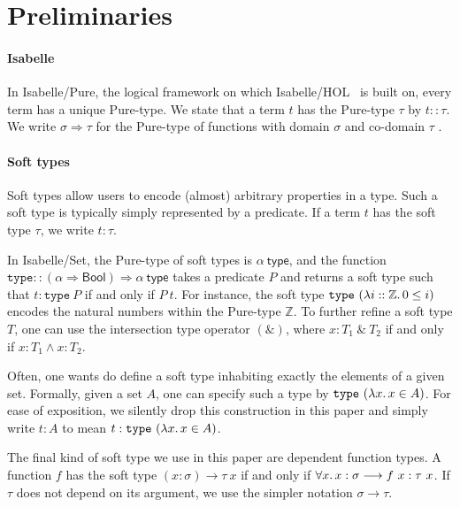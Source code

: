 \documentclass{article}
\theoremstyle{definition}
\newcommand{\bool}{\mathsf{Bool}}
\newcommand{\inte}{\mathbb{Z}}
\begin{document}
\section{Preliminaries}\label{sec-prelims}

\paragraph{Isabelle}
In Isabelle/Pure, the logical framework on which Isabelle/HOL~\cite{wenzel2021isabelle} is built on,
every term has a unique Pure-type. We state that a term \(t\) has the Pure-type \(\tau\) by \(t :: \tau\).
We write \(\sigma \Rightarrow \tau\) for the Pure-type of functions with domain \(\sigma\) and co-domain \(\tau\) .

\paragraph{Soft types}
Soft types allow users to encode (almost) arbitrary properties in a type.
Such a soft type is typically simply represented by a predicate.
If a term \(t\) has the soft type \(\tau\), we write \(t : \tau\).

In Isabelle/Set, the Pure-type of soft types is $\alpha\ \mathsf{type}$,
and the function \(\mathtt{type} :: (\alpha \Rightarrow \bool)\Rightarrow \alpha\ \mathsf{type}\) takes a predicate $P$ and returns a soft type such that
\(t : \mathtt{type}\ P\) if and only if \(P\ t\).
For instance, the soft type \(\mathtt{type}\ (\lambda i :: \inte\ldotp 0 \leq i)\) encodes the natural numbers within the Pure-type \(\inte\).
To further refine a soft type \(T\),
one can use the intersection type operator \((\&)\),
where \(x : T_1\  \&\  T_2\) if and only if \(x : T_1 \land x : T_2\).

Often, one wants do define a soft type inhabiting exactly the elements of a given set.
Formally, given a set $A$, one can specify such a type by \(\mathtt{type}\ (\lambda x\ldotp x \in A)\).
For ease of exposition, we silently drop this construction in this paper and simply write
$t : A$ to mean $t : \mathtt{type}\ (\lambda x\ldotp x \in A)$.

The final kind of soft type we use in this paper are dependent function types.
A function \(f\) has the soft type \((x : \sigma) \rightarrow \tau\ x\) if and only if \(\forall x\ldotp x : \sigma \longrightarrow f\ x : \tau\ x\).
If $\tau$ does not depend on its argument,
we use the simpler notation \(\sigma \rightarrow \tau\).
\newline
\end{document}
